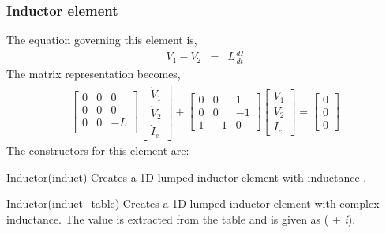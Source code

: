 \subsubsection*{Inductor element}
The equation governing this element is,
\begin{eqnarray}
V_1-V_2 &=& L\frac{dI}{dt}
\end{eqnarray}
The matrix representation becomes,
\begin{eqnarray}
\left[
\begin{array}{ccc}
0 & 0 & 0  \\
0 & 0 & 0  \\
0 & 0 &-L  \\
\end{array}
\right]
\left[
\begin{array}{c}
\dot{V}_1 \\
\dot{V}_2 \\
\dot{I}_e
\end{array}
\right]
+
\left[
\begin{array}{rrr}
0  &  0 & 1  \\
0  &  0 &-1  \\
1  & -1 & 0
\end{array}
\right]
\left[
\begin{array}{c}
{V}_1 \\
{V}_2 \\
{I}_e
\end{array}
\right]
=
\left[
\begin{array}{c}
0 \\
0 \\
0
\end{array}
\right]
\end{eqnarray}
The constructors for this element are:
\begin{codelist}

  \item[Inductor(induct)]
  Creates a 1D lumped inductor element with inductance . 

  \item[Inductor(induct\_table)]
  Creates a 1D lumped inductor element
  with complex inductance. The value is extracted from the table
   and is given as
  ( + {\it i}).

\end{codelist}

